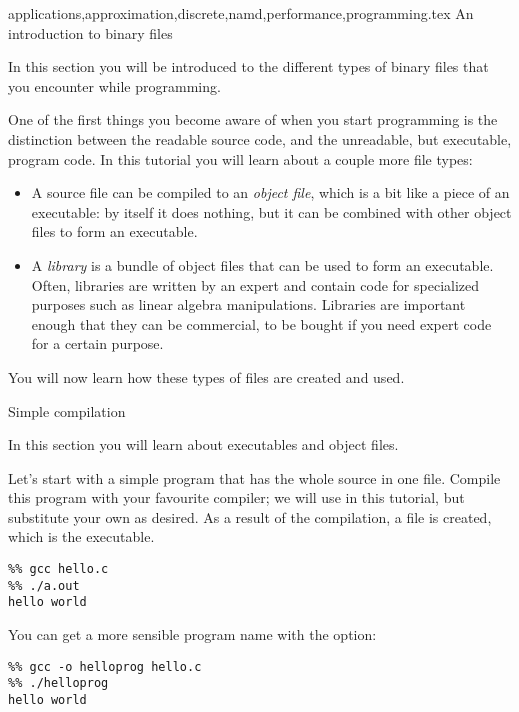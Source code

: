 {applications,approximation,discrete,namd,performance,programming}.tex {An introduction to binary files}

\begin{purpose}
  In this section you will be introduced to the different types of
  binary files that you encounter while programming.
\end{purpose}

One of the first things you become aware of when you start programming
is the distinction between the readable source code, and the
unreadable, but executable, program code. In this tutorial you will
learn about a couple more file types:
\begin{itemize}
\item A source file can be compiled to an \emph{object file}, which is
  a bit like a piece of an executable: by itself it does nothing, but
  it can be combined with other object files to form an executable.
\item A \emph{library} is a bundle of object files that can be used to
  form an executable. Often, libraries are written by an expert and
  contain code for specialized purposes such as linear algebra
  manipulations. Libraries are important enough that they can be
  commercial, to be bought if you need expert code for a certain purpose.
\end{itemize}
You will now learn how these types of files are created and used.

 {Simple compilation}

\begin{purpose}
  In this section you will learn about executables and object files.
\end{purpose}

Let's start with a simple program that has the whole source in one
file.
Compile this program with your favourite compiler; we will use 
in this tutorial, but substitute your own as desired. As a result of
the compilation, a file  is created, which is the executable.
\begin{verbatim}
%% gcc hello.c
%% ./a.out
hello world
\end{verbatim}
You can get a more sensible program name with the  option:
\begin{verbatim}
%% gcc -o helloprog hello.c
%% ./helloprog
hello world
\end{verbatim}

